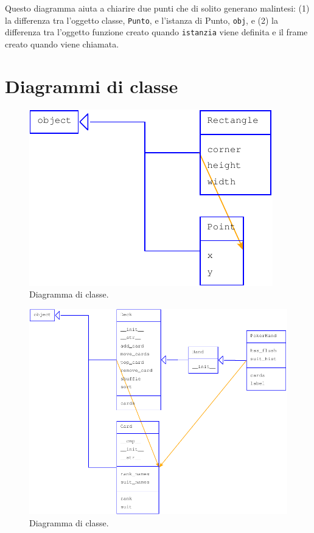 \documentclass[10pt]{book}
\begin{document}
Questo diagramma aiuta a chiarire due punti che di solito generano malintesi: (1) la differenza tra l'oggetto classe, {\tt Punto}, e l'istanza di Punto, {\tt obj}, e (2) la differenza tra l'oggetto funzione creato quando {\tt istanzia} viene definita e il frame creato quando viene chiamata.


\section{Diagrammi di classe}

\begin{figure}
\centerline
{\includegraphics[scale=0.7]{figs/lumpydemo7.pdf}}
\caption{Diagramma di classe.}
\label{fig.lumpy7}
\end{figure}

\begin{figure}
\centerline
{\includegraphics[scale=0.7]{figs/lumpydemo8.pdf}}
\caption{Diagramma di classe.}
\label{fig.lumpy8}
\end{figure}
\end{document}
